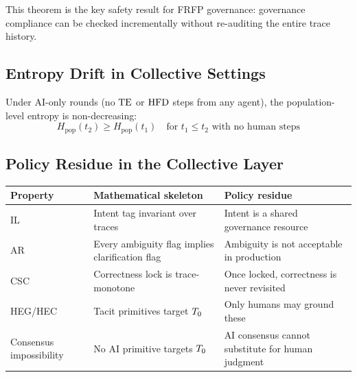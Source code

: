 This theorem is the key safety result for FRFP governance: governance compliance
can be checked incrementally without re-auditing the entire trace history.

\subsection{Entropy Drift in Collective Settings}

\begin{theorem}
Under AI-only rounds (no $\mathrm{TE}$ or $\mathrm{HFD}$ steps from any agent), the
population-level entropy is non-decreasing:
\[
  H_{\mathrm{pop}}(t_2) \geq H_{\mathrm{pop}}(t_1) \quad
  \text{for } t_1 \leq t_2 \text{ with no human steps}
\]
\end{theorem}

\subsection{Policy Residue in the Collective Layer}

\begin{center}
\begin{tabular}{p{1.8cm}p{5cm}p{5cm}}
\toprule
Property & Mathematical skeleton & Policy residue \\
\midrule
IL & Intent tag invariant over traces & Intent is a shared governance resource \\
AR & Every ambiguity flag implies clarification flag & Ambiguity is not acceptable in production \\
CSC & Correctness lock is trace-monotone & Once locked, correctness is never revisited \\
HEG/HEC & Tacit primitives target $T_0$ & Only humans may ground these \\
Consensus impossibility & No AI primitive targets $T_0$ & AI consensus cannot substitute for human judgment \\
\bottomrule
\end{tabular}
\end{center}

